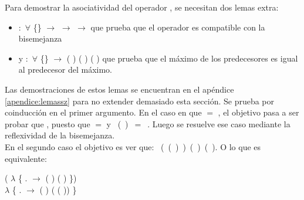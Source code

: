 Para demostrar la asociatividad del operador , se necesitan dos lemas extra:
\begin{itemize}[noitemsep]
\item {} $:$ $\forall$ \{\} $\rightarrow$ \AgdaFunction{[}  \AgdaFunction{]}  \AgdaFunction{$\sim$}  $\rightarrow$ \AgdaFunction{[}  \AgdaFunction{]}  \AgdaFunction{$\sim$}  $\rightarrow$ \AgdaFunction{[}  \AgdaFunction{]}   \AgdaFunction{$\sim$}   que prueba que el operador  es compatible con la bisemejanza 
\item y  $:$ $\forall$ \{\}  $\rightarrow$ \AgdaFunction{[}  \AgdaFunction{]}  ( ) ( ) \AgdaFunction{$\sim$}  ( ) que prueba que el máximo de los predecesores es igual al predecesor del máximo. 
\end{itemize}
Las demostraciones de estos lemas se encuentran en el apéndice \ref{apendice:lemassz} para no extender demasiado esta sección.
Se prueba  por coinducción en el primer argumento. En el caso en que  $=$ , el objetivo pasa a ser probar que \AgdaFunction{[}  \AgdaFunction{]}   \AgdaFunction{$\sim$}  , puesto que    $=$  y \hbox{  ( ) $=$  }. Luego se resuelve ese caso mediante la reflexividad de la bisemejanza. \\
En el segundo caso el objetivo es ver que: \hbox{\AgdaFunction{[}  \AgdaFunction{]}   ( ( ) )  \AgdaFunction{$\sim$}  ( ) ( )}.
O lo que es equivalente:
\begin{center}
\AgdaFunction{[}  \AgdaFunction{]}   ( $\lambda$ \{ . $\rightarrow$   ( ) (  ) \})  \AgdaFunction{$\sim$} 
\\
 $\lambda$ \{ . $\rightarrow$  ( ) (  ( )) \}
\end{center}
